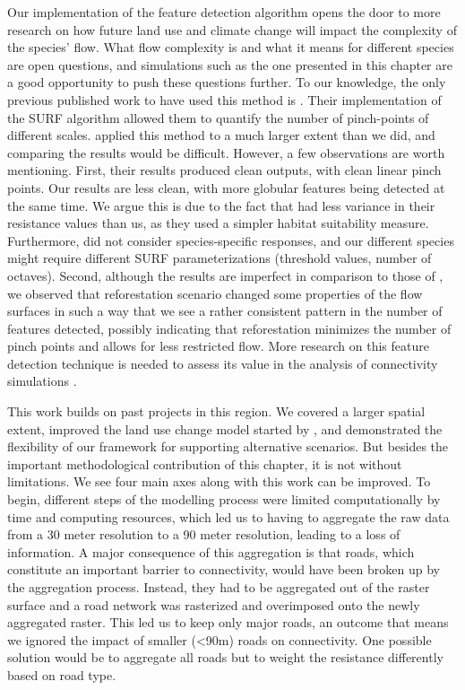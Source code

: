 Our implementation of the feature detection algorithm opens the door to more research on how future land use and climate change will impact the complexity of the species' flow. What flow complexity is and what it means for different species are open questions, and simulations such as the one presented in this chapter are a good opportunity to push these questions further. To our knowledge, the only previous published work to have used this method is \cite{pelletier_forest_2017}. Their implementation of the SURF algorithm allowed them to quantify the number of pinch-points of different scales. \citeauthor{pelletier_forest_2017} applied this method to a much larger extent than we did, and comparing the results would be difficult. However, a few observations are worth mentioning. First, their results produced clean outputs, with clean linear pinch points. Our results are less clean, with more globular features being detected at the same time. We argue this is due to the fact that \citeauthor{pelletier_forest_2017} had less variance in their resistance values than us, as they used a simpler habitat suitability measure. Furthermore, \citeauthor{pelletier_forest_2017} did not consider species-specific responses, and our different species might require different SURF parameterizations (threshold values, number of octaves). Second, although the results are imperfect in comparison to those of \cite{pelletier_forest_2017}, we observed that reforestation scenario changed some properties of the flow surfaces in such a way that we see  a rather consistent pattern in the number of features detected, possibly indicating that reforestation minimizes the number of pinch points and allows for less restricted flow. More research on this feature detection technique is needed to assess its value in the analysis of connectivity simulations \cite{pelletier_forest_2017}.

This work builds on past projects in this region. We covered a larger spatial extent, improved the land use change model started by \cite{albert_applying_2017}, and demonstrated the flexibility of our framework for supporting alternative scenarios. But besides the important methodological contribution of this chapter, it is not without limitations. We see four main axes along with this work can be improved. To begin, different steps of the modelling process were limited computationally by time and computing resources, which led us to having to aggregate the raw data from a 30 meter resolution to a 90 meter resolution, leading to a loss of information. A major consequence of this aggregation is that roads, which constitute an important barrier to connectivity, would have been broken up by the aggregation process. Instead, they had to be aggregated out of the raster surface and a road network was rasterized and overimposed onto the newly aggregated raster. This led us to keep only major roads, an outcome that means we ignored the impact of smaller (<90m) roads on connectivity. One possible solution would be to aggregate all roads but to weight the resistance differently based on road type. 

